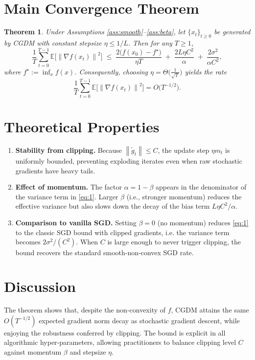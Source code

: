 \documentclass{article}
\newtheorem{theorem}{Theorem}
\newcommand{\EE}{\mathbb{E}}
\newcommand{\norm}[1]{\left\|#1\right\|}
\newcommand{\grad}{\nabla}
\begin{document}
\section*{Main Convergence Theorem}
\begin{theorem}\label{thm:main}
Under Assumptions \ref{ass:smooth}–\ref{ass:beta}, let $\{x_t\}_{t\ge0}$ be generated by CGDM with constant stepsize $\eta\le 1/L$. Then for any $T\ge1$,
\[
    \frac{1}{T}\sum_{t=0}^{T-1}\EE\!\bigl[\norm{\grad f(x_t)}^2\bigr]
    \;\le\;
    \frac{2\bigl(f(x_0)-f^\star\bigr)}{\eta T}
    \;+\;
    \frac{2L\eta C^2}{\alpha}\;+\;
    \frac{2\sigma^2}{\alpha C^2},
\tag{1}
\]
where $f^\star:=\inf_{x}f(x)$.
Consequently, choosing $\eta = \Theta\!\bigl(\tfrac{1}{\sqrt{T}}\bigr)$ yields the rate
\[
    \frac{1}{T}\sum_{t=0}^{T-1}\EE\!\bigl[\norm{\grad f(x_t)}^2\bigr] = O\!\bigl(T^{-1/2}\bigr).
\]
\end{theorem}

\section*{Theoretical Properties}
\begin{enumerate}[label=\arabic*)]
    \item \textbf{Stability from clipping.} Because $\norm{\tilde g_t}\le C$, the update step $\eta m_t$ is uniformly bounded, preventing exploding iterates even when raw stochastic gradients have heavy tails.
    \item \textbf{Effect of momentum.} The factor $\alpha=1-\beta$ appears in the denominator of the variance term in \eqref{eq:1}. Larger $\beta$ (i.e., stronger momentum) reduces the effective variance but also slows down the decay of the bias term $L\eta C^2/\alpha$.
    \item \textbf{Comparison to vanilla SGD.} Setting $\beta=0$ (no momentum) reduces \eqref{eq:1} to the classic SGD bound with clipped gradients, i.e. the variance term becomes $2\sigma^2/(C^2)$. When $C$ is large enough to never trigger clipping, the bound recovers the standard smooth‑non‑convex SGD rate.
\end{enumerate}

\section*{Discussion}
The theorem shows that, despite the non‑convexity of $f$, CGDM attains the same $O(T^{-1/2})$ expected gradient norm decay as stochastic gradient descent, while enjoying the robustness conferred by clipping. The bound is explicit in all algorithmic hyper‑parameters, allowing practitioners to balance clipping level $C$ against momentum $\beta$ and stepsize $\eta$.
\end{document}
